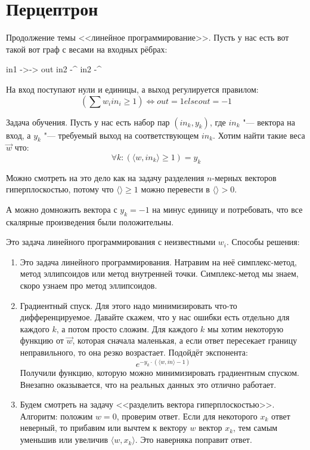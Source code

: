 \date{October 13, 2016}
\author{Egor Suvorov}

\section{Перцептрон}

Продолжение темы <<линейное программирование>>.
Пусть у нас есть вот такой вот граф с весами на входных рёбрах:

in1 ->-> out
in2 -^
in2 -^

На вход поступают нули и единицы, а выход регулируется правилом:
\[
	\left( \sum w_i in_i \ge 1 \right) \iff out = 1 else out = -1
\]

Задача обучения.
Пусть у нас есть набор пар $(in_k, y_k)$, где $in_k$ "--- вектора на вход,
а $y_k$ "--- требуемый выход на соответствующем $in_k$.
Хотим найти такие веса $\vec w$ что:
\[
	\forall k \colon (\langle w, in_k \rangle \ge 1) = y_k
\]

\begin{Rem}
	Можно смотреть на это дело как на задачу разделения $n$-мерных векторов гиперплоскостью,
	потому что $\langle \rangle \ge 1$ можно перевести в $\langle \rangle > 0$.
\end{Rem}
\begin{Rem}
	А можно домножить вектора с $y_k=-1$ на минус единицу и потребовать,
	что все скалярные произведения были положительны.
\end{Rem}

Это задача линейного программирования с неизвестными $w_i$.
Способы решения:
\begin{enumerate}
	\item
		Это задача линейного программирования.
		Натравим на неё симплекс-метод, метод эллипсоидов или метод внутренней точки.
		Симплекс-метод мы знаем, скоро узнаем про метод эллипсоидов.
	\item
		Градиентный спуск.
		Для этого надо минимизировать что-то дифференцируемое.
		Давайте скажем, что у нас ошибки есть отдельно для каждого $k$, а потом просто сложим.
		Для каждого $k$ мы хотим некоторую функцию от $\vec w$, которая сначала маленькая,
		а если ответ пересекает границу неправильного, то она резко возрастает.
		Подойдёт экспонента:
		\[
			e^{-y_k \cdot (\langle w, in \rangle - 1)}
		\]
		Получили функцию, которую можно минимизировать градиентным спуском.
		Внезапно оказывается, что на реальных данных это отлично работает.
	\item
		Будем смотреть на задачу <<разделить вектора гиперплоскостью>>.
		Алгоритм: положим $w=0$, проверим ответ.
		Если для некоторого $x_k$ ответ неверный, то прибавим или вычтем к вектору $w$ вектор $x_k$,
		тем самым уменьшив или увеличив $\langle w, x_k \rangle$.
		Это наверняка поправит ответ.
\end{enumerate}

